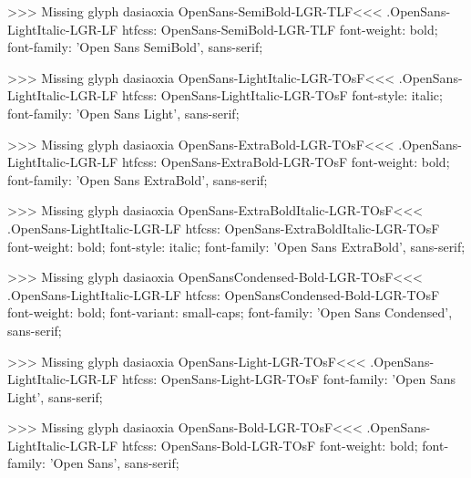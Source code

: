 >>>
Missing glyph	dasiaoxia
\<OpenSans-SemiBold-LGR-TLF\><<<
.OpenSans-LightItalic-LGR-LF
htfcss:  OpenSans-SemiBold-LGR-TLF  font-weight: bold; font-family: 'Open Sans SemiBold', sans-serif;

>>>
Missing glyph	dasiaoxia
\<OpenSans-LightItalic-LGR-TOsF\><<<
.OpenSans-LightItalic-LGR-LF
htfcss:  OpenSans-LightItalic-LGR-TOsF  font-style: italic; font-family: 'Open Sans Light', sans-serif;

>>>
Missing glyph	dasiaoxia
\<OpenSans-ExtraBold-LGR-TOsF\><<<
.OpenSans-LightItalic-LGR-LF
htfcss:  OpenSans-ExtraBold-LGR-TOsF  font-weight: bold; font-family: 'Open Sans ExtraBold', sans-serif;

>>>
Missing glyph	dasiaoxia
\<OpenSans-ExtraBoldItalic-LGR-TOsF\><<<
.OpenSans-LightItalic-LGR-LF
htfcss:  OpenSans-ExtraBoldItalic-LGR-TOsF  font-weight: bold; font-style: italic; font-family: 'Open Sans ExtraBold', sans-serif;

>>>
Missing glyph	dasiaoxia
\<OpenSansCondensed-Bold-LGR-TOsF\><<<
.OpenSans-LightItalic-LGR-LF
htfcss:  OpenSansCondensed-Bold-LGR-TOsF  font-weight: bold; font-variant: small-caps; font-family: 'Open Sans Condensed', sans-serif;

>>>
Missing glyph	dasiaoxia
\<OpenSans-Light-LGR-TOsF\><<<
.OpenSans-LightItalic-LGR-LF
htfcss:  OpenSans-Light-LGR-TOsF  font-family: 'Open Sans Light', sans-serif;

>>>
Missing glyph	dasiaoxia
\<OpenSans-Bold-LGR-TOsF\><<<
.OpenSans-LightItalic-LGR-LF
htfcss:  OpenSans-Bold-LGR-TOsF  font-weight: bold; font-family: 'Open Sans', sans-serif;

